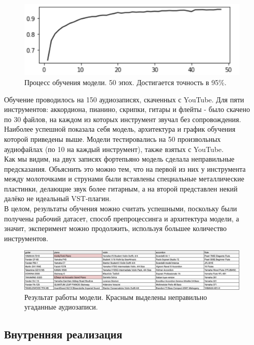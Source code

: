 \documentclass[14pt,a4paper]{article}
\begin{document}
\begin{figure}[H]
\centering
\includegraphics[scale=0.3]{img/training.png}
\caption{Процесс обучения модели. 50 эпох. Достигается точность в 95\%.}
\end{figure}

Обучение проводилось на 150 аудиозаписях, скаченных с YouTube. Для пяти инструментов: аккордиона, пианино, скрипки, гитары и флейты - было скачено по 30 файлов, на каждом из которых инструмент звучал без сопровождения. \\

Наиболее успешной показала себя модель, архитектура и график обучения которой приведены выше. Модели тестировались на 50 произвольных аудиофайлах (по 10 на каждый инструмент), также взятых с YouTube. \\

Как мы видим, на двух записях фортепьяно модель сделала неправильные предсказания. Объяснить это можно тем, что на первой из них у инструмента между молоточками и струнами были вставлены специальные металлические пластинки, делающие звук более гитарным, а на второй представлен некий далёко не идеальный VST-плагин. \\

В целом, результаты обучения можно считать успешными, поскольку были получены рабочий датасет, способ препроцессинга и архитектура модели, а значит, эксперимент можно продолжить, используя большее количество инструментов.

\begin{figure}[H]
\centering
\includegraphics[scale=0.37]{img/results.png}
\caption{Результат работы модели. Красным выделены неправильно угаданные аудиозаписи.}
\end{figure}

\subsection{Внутренняя реализация}
\end{document}
